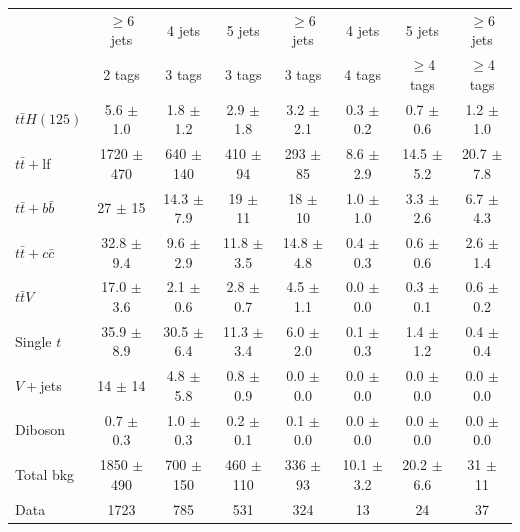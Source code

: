 \begin{table}
\begin{adjustwidth}{-1.7in}{-1.7in}
\begin{tabular}{|l|c|c|c|c|c|c|c|}
& $\geq$6 jets & 4 jets & 5 jets & $\geq$6 jets & 4 jets & 5 jets & $\geq$6 jets \\
& 2 tags & 3 tags & 3 tags & 3 tags & 4 tags & $\geq$4 tags & $\geq$4 tags \\ \hline \hline
$t\bar{t}H(125)$ & 5.6 $\pm$ 1.0 & 1.8 $\pm$ 1.2 & 2.9 $\pm$ 1.8 & 3.2 $\pm$ 2.1 & 0.3 $\pm$ 0.2 & 0.7 $\pm$ 0.6 & 1.2 $\pm$ 1.0 \\
 \hline
$t\bar{t}+$lf & 1720 $\pm$ 470 & 640 $\pm$ 140 & 410 $\pm$ 94 & 293 $\pm$ 85 & 8.6 $\pm$ 2.9 & 14.5 $\pm$ 5.2 & 20.7 $\pm$ 7.8 \\
$t\bar{t}+b\bar{b}$ & 27 $\pm$ 15 & 14.3 $\pm$ 7.9 & 19 $\pm$ 11 & 18 $\pm$ 10 & 1.0 $\pm$ 1.0 & 3.3 $\pm$ 2.6 & 6.7 $\pm$ 4.3 \\
$t\bar{t}+c\bar{c}$ & 32.8 $\pm$ 9.4 & 9.6 $\pm$ 2.9 & 11.8 $\pm$ 3.5 & 14.8 $\pm$ 4.8 & 0.4 $\pm$ 0.3 & 0.6 $\pm$ 0.6 & 2.6 $\pm$ 1.4 \\
$t\bar{t}V$ & 17.0 $\pm$ 3.6 & 2.1 $\pm$ 0.6 & 2.8 $\pm$ 0.7 & 4.5 $\pm$ 1.1 & 0.0 $\pm$ 0.0 & 0.3 $\pm$ 0.1 & 0.6 $\pm$ 0.2 \\
Single $t$ & 35.9 $\pm$ 8.9 & 30.5 $\pm$ 6.4 & 11.3 $\pm$ 3.4 & 6.0 $\pm$ 2.0 & 0.1 $\pm$ 0.3 & 1.4 $\pm$ 1.2 & 0.4 $\pm$ 0.4 \\
$V+$jets & 14 $\pm$ 14 & 4.8 $\pm$ 5.8 & 0.8 $\pm$ 0.9 & 0.0 $\pm$ 0.0 & 0.0 $\pm$ 0.0 & 0.0 $\pm$ 0.0 & 0.0 $\pm$ 0.0 \\
Diboson & 0.7 $\pm$ 0.3 & 1.0 $\pm$ 0.3 & 0.2 $\pm$ 0.1 & 0.1 $\pm$ 0.0 & 0.0 $\pm$ 0.0 & 0.0 $\pm$ 0.0 & 0.0 $\pm$ 0.0 \\
 \hline
Total bkg & 1850 $\pm$ 490 & 700 $\pm$ 150 & 460 $\pm$ 110 & 336 $\pm$ 93 & 10.1 $\pm$ 3.2 & 20.2 $\pm$ 6.6 & 31 $\pm$ 11 \\
 \hline
Data & 1723 & 785 & 531 & 324 & 13 & 24 & 37 \\
\hline
\end{tabular}
  \end{adjustwidth}
\end{table}



